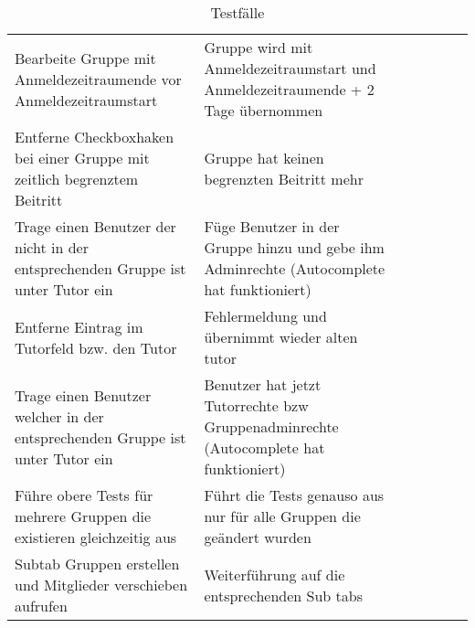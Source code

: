 \begin{table}[]
	\centering
	\caption{Testfälle}
	\label{my-label}
	\begin{tabular}{p{6cm}p{7cm}p{3cm}llll}
		Bearbeite Gruppe mit Anmeldezeitraumende vor Anmeldezeitraumstart                                                                    & Gruppe wird mit Anmeldezeitraumstart und Anmeldezeitraumende + 2 Tage übernommen                                                                                 & \checkmark            &  &  &  \\
		
		Entferne Checkboxhaken bei einer Gruppe mit zeitlich begrenztem Beitritt                                                             & Gruppe hat keinen begrenzten Beitritt mehr                                                                                                                       & \checkmark           &  &  &  \\
		Trage einen Benutzer der nicht in der entsprechenden Gruppe ist unter Tutor ein                                                      & Füge Benutzer in der Gruppe hinzu und gebe ihm Adminrechte (Autocomplete hat funktioniert)                                                                       & \checkmark           &  &  &  \\
		Entferne Eintrag im Tutorfeld bzw. den Tutor                                                                                         & Fehlermeldung und übernimmt wieder alten tutor                                                                                                                   &             &  &  &  \\
		Trage einen Benutzer welcher in der entsprechenden Gruppe ist unter Tutor ein                                                        & Benutzer hat jetzt Tutorrechte bzw Gruppenadminrechte (Autocomplete hat funktioniert)                                                                            & \checkmark           &  &  &  \\
		Führe obere Tests für mehrere Gruppen die existieren gleichzeitig aus                                                                & Führt die Tests genauso aus nur für alle Gruppen die geändert wurden                                                                                             & \checkmark           &  &  &  \\

		Subtab Gruppen erstellen und Mitglieder verschieben aufrufen                                                                         & Weiterführung auf die entsprechenden Sub tabs                                                                                                                    & \checkmark           &  &  &  \\
	

\end{tabular}
\end{table}
